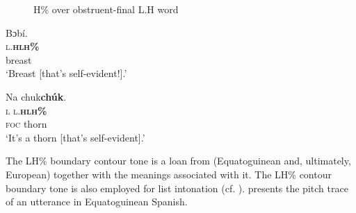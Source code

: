 \begin{figure}
\caption{H\% over obstruent-final L.H word}
\label{fig:key:3.34}
\end{figure}

\clearpage 
\ea%
    \label{ex:key:86}
    \glll   Bɔbí.\\
\textsc{l.}\textbf{\textsc{h}}\textbf{\textsc{lh\%}}\\
breast\\
\glt ‘Breast [that’s self-evident!].’ 
\z

\ea
\label{ex:key:87}
\glll Na  chuk\textbf{chúk}.\\
\textsc{l}  \textsc{l.}\textbf{\textsc{hlh\%}}\\
\textsc{foc}  thorn\\
\glt ‘It’s a thorn [that’s self-evident].’
\z

The LH\% boundary contour tone is a loan from (Equatoguinean and, ultimately, European)  together with the meanings associated with it. The LH\% contour boundary tone is also employed for list intonation (cf. ).  presents the pitch trace of an utterance in Equatoguinean Spanish.


